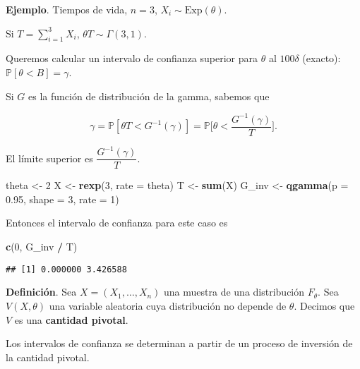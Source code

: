 \documentclass[
  12pt,
]{book}
\newenvironment{Shaded}{\begin{snugshade}}{\end{snugshade}}
\newcommand{\DataTypeTok}[1]{\textcolor[rgb]{0.13,0.29,0.53}{#1}}
\newcommand{\DecValTok}[1]{\textcolor[rgb]{0.00,0.00,0.81}{#1}}
\newcommand{\FloatTok}[1]{\textcolor[rgb]{0.00,0.00,0.81}{#1}}
\newcommand{\KeywordTok}[1]{\textcolor[rgb]{0.13,0.29,0.53}{\textbf{#1}}}
\newcommand{\NormalTok}[1]{#1}
\newcommand{\OperatorTok}[1]{\textcolor[rgb]{0.81,0.36,0.00}{\textbf{#1}}}
\newcommand{\StringTok}[1]{\textcolor[rgb]{0.31,0.60,0.02}{#1}}
\begin{document}
\textbf{Ejemplo}. Tiempos de vida, \(n=3\), \(X_i\sim \text{Exp}(\theta)\).

Si \(T = \sum_{i=1}^3X_i\), \(\theta T\sim \Gamma(3,1)\).

Queremos calcular un intervalo de confianza superior para \(\theta\) al
\(100\delta\) (exacto): \(\mathbb P[\theta<B] = \gamma\).

Si \(G\) es la función de distribución de la gamma, sabemos que

\begin{equation*}
\gamma = \mathbb{P}[\theta T<G^{-1}(\gamma)] = \mathbb{P}\bigg[\theta<\dfrac{G^{-1}(\gamma)}{T}\bigg].
\end{equation*}

El límite superior es \(\dfrac{G^{-1}(\gamma)}{T}\).

\begin{Shaded}
\begin{Highlighting}[]
\NormalTok{theta \textless{}{-}}\StringTok{ }\DecValTok{2}
\NormalTok{X \textless{}{-}}\StringTok{ }\KeywordTok{rexp}\NormalTok{(}\DecValTok{3}\NormalTok{, }\DataTypeTok{rate =}\NormalTok{ theta)}
\NormalTok{T \textless{}{-}}\StringTok{ }\KeywordTok{sum}\NormalTok{(X)}
\NormalTok{G\_inv \textless{}{-}}\StringTok{ }\KeywordTok{qgamma}\NormalTok{(}\DataTypeTok{p =} \FloatTok{0.95}\NormalTok{, }\DataTypeTok{shape =} \DecValTok{3}\NormalTok{, }\DataTypeTok{rate =} \DecValTok{1}\NormalTok{)}
\end{Highlighting}
\end{Shaded}

Entonces el intervalo de confianza para este caso es

\begin{Shaded}
\begin{Highlighting}[]
\KeywordTok{c}\NormalTok{(}\DecValTok{0}\NormalTok{, G\_inv }\OperatorTok{/}\StringTok{ }\NormalTok{T)}
\end{Highlighting}
\end{Shaded}

\begin{verbatim}
## [1] 0.000000 3.426588
\end{verbatim}

\textbf{Definición}. Sea \(X = (X_1,\dots,X_n)\) una muestra de una distribución
\(F_\theta\). Sea \(V(X,\theta)\) una variable aleatoria cuya distribución no
depende de \(\theta\). Decimos que \(V\) es una \textbf{cantidad pivotal}.

Los intervalos de confianza se determinan a partir de un proceso de inversión de
la cantidad pivotal.
\end{document}

